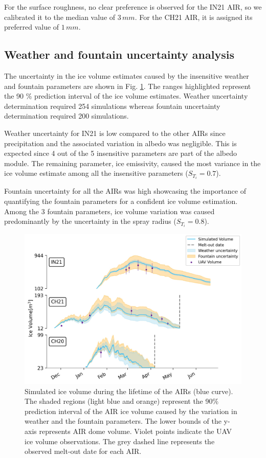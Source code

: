 \documentclass[utf8]{frontiersSCNS}
\begin{document}
For the surface roughness, no clear preference is observed for the IN21 AIR, so we calibrated it to the median
value of $3 \, mm$. For the CH21 AIR, it is assigned its preferred value of $1 \, mm$.

\subsection{Weather and fountain uncertainty analysis}

The uncertainty in the ice volume estimates caused by the insensitive weather and fountain parameters are shown in
Fig. \ref{fig:results}. The ranges highlighted represent the 90 \% prediction interval of the ice volume estimates.
Weather uncertainty determination required 254 simulations whereas fountain uncertainty determination required 200 simulations.

Weather uncertainty for IN21 is low compared to the other AIRs since precipitation and the associated variation in
albedo was negligible. This is expected since 4 out of the 5 insensitive parameters are part of the albedo module.
The remaining parameter, ice emissivity, caused the most variance in the ice volume estimate among all the
insensitive parameters ($S_{T_{i}} = 0.7$).

Fountain uncertainty for all the AIRs was high showcasing the importance of quantifying the fountain parameters for
a confident ice volume estimation. Among the 3 fountain parameters, ice volume variation was caused predominantly
by the uncertainty in the spray radius ($S_{T_{i}} = 0.8$).

\begin{figure}
	\begin{center}
		\includegraphics[width=\linewidth]{Figures/icev_results.jpg}
	\end{center}
	\caption{Simulated ice volume during the lifetime of the AIRs (blue curve). The shaded regions (light blue and
		orange) represent the 90\% prediction interval of the AIR ice volume caused by the variation in weather and
		the fountain parameters.  The lower bounds of the y-axis represents AIR dome volume. Violet points indicate
		the UAV ice volume observations.  The grey dashed line represents the observed melt-out date for each AIR.  }

	\label{fig:results}
\end{figure}
\end{document}
